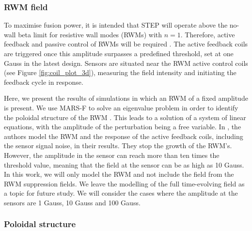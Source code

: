 \documentclass[10pt, a4paper, twoside]{article}
\begin{document}
\subsubsection{RWM field}

To maximise fusion power, it is intended that STEP will operate above the no-wall beta limit for resistive wall modes (RWMs) with $n=1$. Therefore, active feedback and passive control of RWMs will be required \cite{xia2023}. The active feedback coils are triggered once this amplitude surpasses a predefined threshold, set at one Gauss in the latest design.
Sensors are situated near the RWM active control coils (see Figure \ref{fig:coil_plot_3d}), measuring the field intensity and initiating the feedback cycle in response.

Here, we present the results of simulations in which an RWM of a fixed amplitude is present. 
We use MARS-F to solve an eigenvalue problem in order to identify the poloidal structure of the RWM \cite{xia2023}. This leads to a solution of a system of linear equations, with the amplitude of the perturbation being a free variable.
In \cite{xia2023}, the authors model the RWM and the response of the active feedback coils, including the sensor signal noise, in their results. They stop the growth of the RWM's. However, the amplitude in the sensor can reach more than ten times the threshold value, meaning that the field at the sensor can be as high as 10 Gauss. In this work, we will only model the RWM and not include the field from the RWM suppression fields. We leave the modelling of the full time-evolving field as a topic for future study. We will consider the cases where the amplitude at the sensors are 1 Gauss, 10 Gauss and 100 Gauss.


\subsubsection{Poloidal structure}
\end{document}
